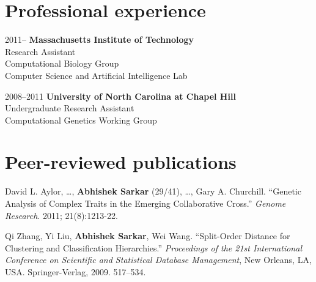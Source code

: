 \documentclass{article}
\begin{document}
\section*{Professional experience}
\begin{hdesc}[itemsep=1em]
\item[2011--] \textbf{Massachusetts Institute of Technology}\\
Research Assistant\\
Computational Biology Group\\
Computer Science and Artificial Intelligence Lab

\item[2008--2011] \textbf{University of North Carolina at Chapel Hill}\\
Undergraduate Research Assistant\\
Computational Genetics Working Group
\end{hdesc}

\section*{Peer-reviewed publications}
\begin{henum}
\item David L. Aylor, \ldots, \textbf{Abhishek Sarkar} (29/41), \ldots, Gary A.
  Churchill. ``Genetic Analysis of Complex Traits in the Emerging Collaborative
  Cross.'' \emph{Genome Research}. 2011; 21(8):1213-22.

\item Qi Zhang, Yi Liu, \textbf{Abhishek Sarkar}, Wei Wang. ``Split-Order
  Distance for Clustering and Classification Hierarchies.'' \emph{Proceedings
    of the 21st International Conference on Scientific and Statistical Database
    Management}, New Orleans, LA, USA. Springer-Verlag, 2009. 517–534.
\end{henum}
\end{document}

